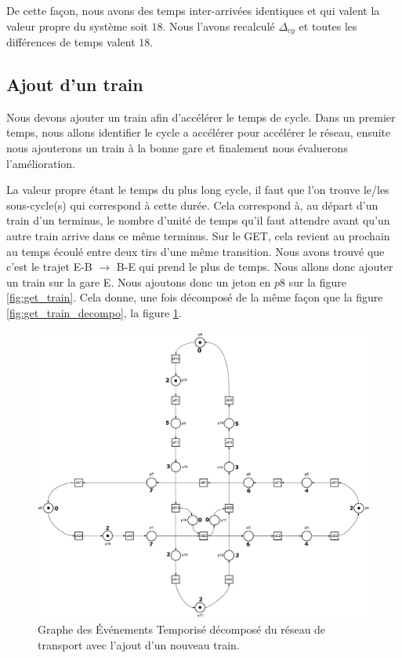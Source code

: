 De cette façon, nous avons des temps inter-arrivées identiques et qui valent la valeur propre du système soit $18$. Nous l'avons recalculé $\Delta_{cy}$ et toutes les différences de temps valent $18$.


\subsection{Ajout d'un train}
Nous devons ajouter un train afin d'accélérer le temps de cycle. Dans un premier temps, nous allons identifier le cycle a accélérer pour accélérer le réseau, ensuite nous ajouterons un train à la bonne gare et finalement nous évaluerons l'amélioration.

La valeur propre étant le temps du plus long cycle, il faut que l'on trouve le/les sous-cycle(s) qui correspond à cette durée. Cela correspond à, au départ d'un train d'un terminus, le nombre d'unité de temps qu'il faut attendre avant qu'un autre train arrive dans ce même terminus. Sur le GET, cela revient au prochain au temps écoulé entre deux tirs d'une même transition.
Nous avons trouvé que c'est le trajet E-B  $\rightarrow$  B-E qui prend le plus de temps. Nous allons donc ajouter un train sur la gare E. 
Nous ajoutons donc un jeton en $p8$ sur la figure \ref{fig:get_train}. Cela donne, une fois décomposé de la même façon que la figure \ref{fig:get_train_decompo}, la figure \ref{fig:get_train_decompo2}.

\begin{figure}[!ht]
\centering
\includegraphics[width = .8\textwidth]{./I/images/train_decompose2.pdf}
\caption{\label{fig:get_train_decompo2} Graphe des Événements Temporisé décomposé du réseau de transport avec l'ajout d'un nouveau train.}
\end{figure}

